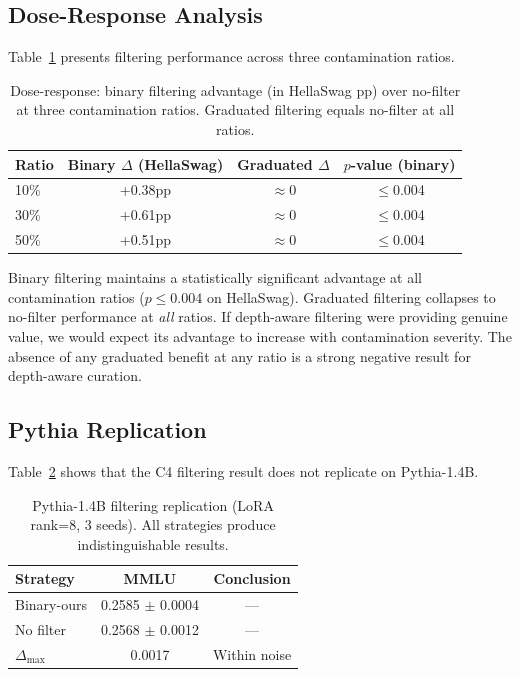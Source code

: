 \documentclass[11pt]{article}
\begin{document}
\subsection{Dose-Response Analysis}

Table~\ref{tab:dose} presents filtering performance across three contamination ratios.

\begin{table}[t]
\centering
\caption{Dose-response: binary filtering advantage (in HellaSwag pp) over no-filter at three contamination ratios. Graduated filtering equals no-filter at all ratios.}
\label{tab:dose}
\small
\begin{tabular}{lccc}
\toprule
Ratio & Binary $\Delta$ (HellaSwag) & Graduated $\Delta$ & $p$-value (binary) \\
\midrule
10\% & +0.38pp & $\approx$0 & $\leq$0.004 \\
30\% & +0.61pp & $\approx$0 & $\leq$0.004 \\
50\% & +0.51pp & $\approx$0 & $\leq$0.004 \\
\bottomrule
\end{tabular}
\end{table}

Binary filtering maintains a statistically significant advantage at all contamination ratios ($p \leq 0.004$ on HellaSwag). Graduated filtering collapses to no-filter performance at \emph{all} ratios. If depth-aware filtering were providing genuine value, we would expect its advantage to increase with contamination severity. The absence of any graduated benefit at any ratio is a strong negative result for depth-aware curation.

\subsection{Pythia Replication}

Table~\ref{tab:pythia_filter} shows that the C4 filtering result does not replicate on Pythia-1.4B.

\begin{table}[t]
\centering
\caption{Pythia-1.4B filtering replication (LoRA rank=8, 3 seeds). All strategies produce indistinguishable results.}
\label{tab:pythia_filter}
\small
\begin{tabular}{lcc}
\toprule
Strategy & MMLU & Conclusion \\
\midrule
Binary-ours & 0.2585 $\pm$ 0.0004 & --- \\
No filter & 0.2568 $\pm$ 0.0012 & --- \\
$\Delta_{\max}$ & 0.0017 & Within noise \\
\bottomrule
\end{tabular}
\end{table}
\end{document}
